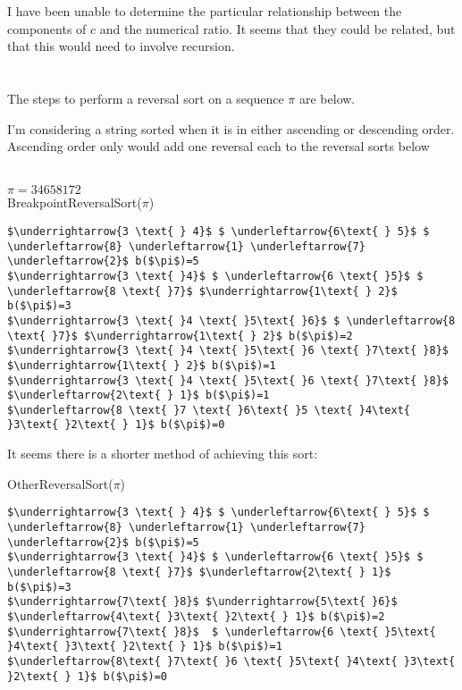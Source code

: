 \documentclass[12pt]{amsart}
\begin{document}
 I have been unable to determine the particular relationship between the components of $c$ and the numerical ratio.  It seems that they could be related, but that this would need to involve recursion.

\clearpage
\section{} The steps to perform a reversal sort on a sequence $\pi$ are below.\begin{footnote}{I'm considering a string sorted when it is in either ascending or descending order.  Ascending order only would add one reversal each to the reversal sorts below}\end{footnote}\\
$\pi = 3 4 6 5 8 1 7 2$\\
BreakpointReversalSort($\pi$)
\begin{lstlisting}[mathescape=true]
$\underrightarrow{3 \text{ } 4}$ $ \underleftarrow{6\text{ } 5}$ $ \underleftarrow{8} \underleftarrow{1} \underleftarrow{7} \underleftarrow{2}$ b($\pi$)=5
$\underrightarrow{3 \text{ }4}$ $ \underleftarrow{6 \text{ }5}$ $ \underleftarrow{8 \text{ }7}$ $\underrightarrow{1\text{ } 2}$ b($\pi$)=3
$\underrightarrow{3 \text{ }4 \text{ }5\text{ }6}$ $ \underleftarrow{8 \text{ }7}$ $\underrightarrow{1\text{ } 2}$ b($\pi$)=2
$\underrightarrow{3 \text{ }4 \text{ }5\text{ }6 \text{ }7\text{ }8}$ $\underrightarrow{1\text{ } 2}$ b($\pi$)=1
$\underrightarrow{3 \text{ }4 \text{ }5\text{ }6 \text{ }7\text{ }8}$ $\underleftarrow{2\text{ } 1}$ b($\pi$)=1
$\underleftarrow{8 \text{ }7 \text{ }6\text{ }5 \text{ }4\text{ }3\text{ }2\text{ } 1}$ b($\pi$)=0
\end{lstlisting}
It seems there is a shorter method of achieving this sort:

OtherReversalSort($\pi$)
\begin{lstlisting}[mathescape=true]
$\underrightarrow{3 \text{ } 4}$ $ \underleftarrow{6\text{ } 5}$ $ \underleftarrow{8} \underleftarrow{1} \underleftarrow{7} \underleftarrow{2}$ b($\pi$)=5
$\underrightarrow{3 \text{ }4}$ $ \underleftarrow{6 \text{ }5}$ $ \underleftarrow{8 \text{ }7}$ $\underleftarrow{2\text{ } 1}$ b($\pi$)=3
$\underrightarrow{7\text{ }8}$ $\underrightarrow{5\text{ }6}$ $\underleftarrow{4\text{ }3\text{ }2\text{ } 1}$ b($\pi$)=2
$\underrightarrow{7\text{ }8}$  $ \underleftarrow{6 \text{ }5\text{ }4\text{ }3\text{ }2\text{ } 1}$ b($\pi$)=1
$\underleftarrow{8\text{ }7\text{ }6 \text{ }5\text{ }4\text{ }3\text{ }2\text{ } 1}$ b($\pi$)=0
\end{lstlisting}
\end{document}
